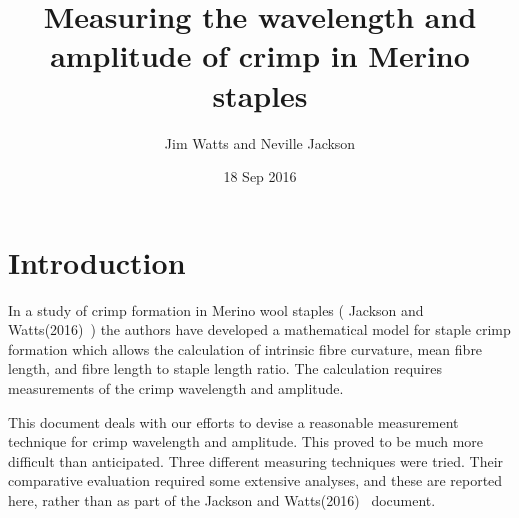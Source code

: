 \documentclass[titlepage,10pt]{article}  %
\title{ Measuring the wavelength and amplitude of crimp in Merino staples}
\author{Jim Watts and Neville Jackson}
\date{18 Sep 2016}
\begin{document}
 
 
\maketitle      
\tableofcontents

\clearpage
\section{Introduction} 
 In a study of  crimp formation in Merino wool staples ( Jackson and Watts(2016)~\cite{jack:16}) the authors have developed a mathematical model for staple crimp formation which allows the calculation of intrinsic fibre curvature, mean fibre length, and fibre length to staple length ratio. The calculation requires measurements of the crimp wavelength and amplitude.

This document deals with our efforts to devise a reasonable measurement technique for crimp wavelength and amplitude. This proved to be much more difficult than anticipated. Three different measuring techniques were tried. Their comparative evaluation required some extensive analyses, and these are reported here, rather than as part of the Jackson and Watts(2016)~\cite{jack:16} document.
\end{document}

